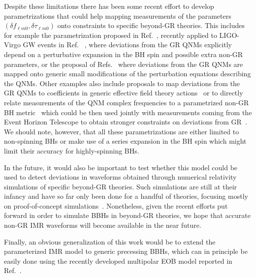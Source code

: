 Despite these limitations there has been some recent effort to develop parametrizations that could help mapping measurements of the parameters $(\delta f_{\ell m 0}, \delta \tau_{\ell m0})$ onto constraints to specific beyond-GR theories. This includes for example the parametrization proposed in Ref.~\cite{Maselli:2019mjd}, recently applied to LIGO-Virgo GW events in Ref. ~\cite{Carullo:2021dui}, where deviations from the GR QNMs explicitly depend on a perturbative expansion in the BH spin and possible extra non-GR parameters, or the proposal of Refs.~\cite{Cardoso:2019mqo,McManus:2019ulj} where deviations from the GR QNMs are mapped onto generic small modifications of the perturbation equations describing the QNMs. Other examples also include proposals to map deviations from the GR QNMs to coefficients in generic effective field theory actions~\cite{Cardoso:2018ptl,Franciolini:2018uyq,Cano:2020cao} or to directly relate measurements of the QNM complex frequencies to a parametrized non-GR BH metric~\cite{Glampedakis:2017dvb,Suvorov:2021amy,Volkel:2020daa} which could be then used jointly with measurements coming from the Event Horizon Telescope to obtain stronger constraints on deviations from GR~\cite{Volkel:2020daa,Volkel:2020xlc,Psaltis:2020lvx,Yang:2021zqy}.
We should note, however, that all these parametrizations are either limited to non-spinning BHs or make use of a series expansion in the BH spin which might limit their accuracy for highly-spinning BHs. 

In the future, it would also be important to test whether this model could be used to detect deviations in waveforms obtained through numerical relativity simulations of specific beyond-GR theories. Such simulations are still at their infancy and have so far only been done for a handful of theories, focusing mostly on proof-of-concept simulations~\cite{Healy:2011ef,Berti:2013gfa,Cao:2013osa,Okounkova:2017yby,Hirschmann:2017psw,Witek:2018dmd,Okounkova:2019dfo,Okounkova:2019zjf,Okounkova:2020rqw,East:2020hgw}. Nonetheless, given the recent efforts put forward in order to simulate BBHs in beyond-GR theories, we hope that accurate non-GR IMR waveforms will become available in the near future.

Finally, an obvious generalization of this work would be to extend the parameterized IMR model to generic precessing BBHs, which can in principle be easily done using the recently developed multipolar EOB model reported in Ref.~\cite{Ossokine:2020kjp}.
